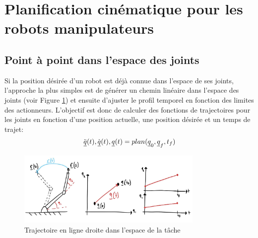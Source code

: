 
\newpage
\section{Planification cinématique pour les robots manipulateurs}

\subsection{Point à point dans l'espace des joints}

Si la position désirée d'un robot est déjà connue dans l'espace de ses joints, l'approche la plus simples est de générer un chemin linéaire dans l'espace des joints (voir Figure \ref{fig:traj_joint_line}) et ensuite d'ajuster le profil temporel en fonction des limites des actionneurs. L'objectif est donc de calculer des fonctions de trajectoires pour les joints en fonction d'une position actuelle, une position désirée et un temps de trajet:
\begin{align}
  \ddot{\underline{q}}(t),\dot{\underline{q}}(t),\underline{q}(t) = plan(\underline{q}_{0}, \underline{q}_f, t_f)
	\label{eq:trajgen}
\end{align}
\begin{figure}[ht]
	\centering
		\includegraphics[width=0.80\textwidth]{fig/traj_joint_line.jpeg}
	\caption{Trajectoire en ligne droite dans l'espace de la tâche}
	\label{fig:traj_joint_line}
\end{figure}

